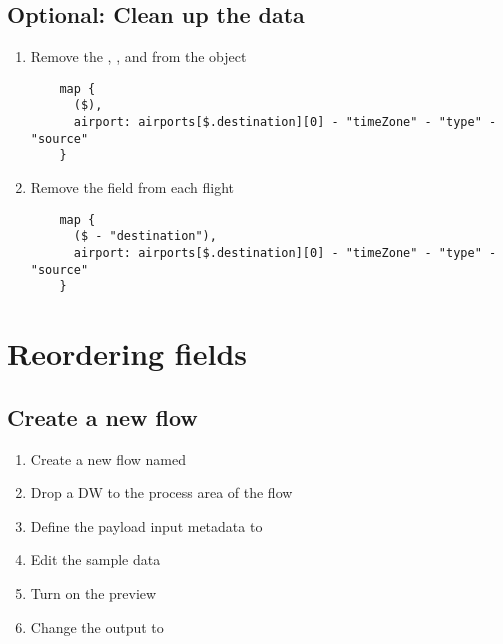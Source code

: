 \subsection{Optional: Clean up the data}
\begin{enumerate}[resume*]
\item Remove the , , and  from the  object
  \begin{lstlisting}
    map {
      ($),
      airport: airports[$.destination][0] - "timeZone" - "type" - "source"
    }
  \end{lstlisting}
\item Remove the  field from each flight
  \begin{lstlisting}
    map {
      ($ - "destination"),
      airport: airports[$.destination][0] - "timeZone" - "type" - "source"
    }
  \end{lstlisting}
\end{enumerate}

\section{Reordering fields}

\subsection{Create a new flow}
\begin{enumerate}
\item Create a new flow named 
\item Drop a DW to the process area of the flow
\item Define the payload input metadata to 
\item Edit the sample data
\item Turn on the preview
\item Change the output to 
\end{enumerate}

